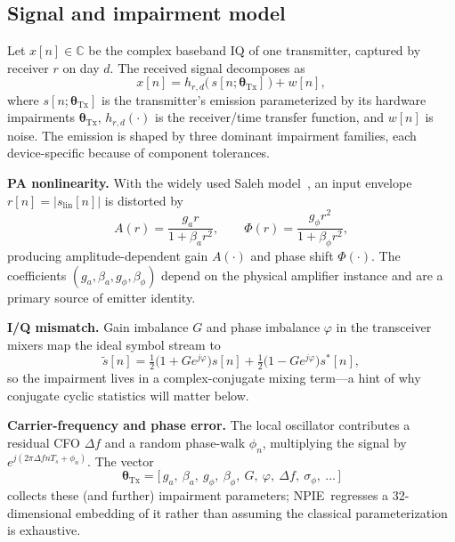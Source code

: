 \documentclass[journal]{IEEEtran}
\newcommand{\npie}{\textsc{NPIE}}
\newcommand{\tx}{\boldsymbol{\theta}_{\mathrm{Tx}}}
\begin{document}
\subsection{Signal and impairment model}
Let $x[n]\in\mathbb{C}$ be the complex baseband IQ of one transmitter, captured by receiver $r$ on day $d$. The received signal decomposes as
\begin{equation}
x[n] = h_{r,d}\big(\,s[n;\tx]\,\big) + w[n],
\label{eq:signal}
\end{equation}
where $s[n;\tx]$ is the transmitter's emission parameterized by its hardware impairments $\tx$, $h_{r,d}(\cdot)$ is the receiver/time transfer function, and $w[n]$ is noise. The emission is shaped by three dominant impairment families, each device-specific because of component tolerances.

\textbf{PA nonlinearity.} With the widely used Saleh model~\cite{saleh1981}, an input envelope $r[n]=|s_{\mathrm{lin}}[n]|$ is distorted by
\begin{equation}
A(r) = \frac{g_a r}{1+\beta_a r^2}, \qquad
\Phi(r) = \frac{g_\phi r^2}{1+\beta_\phi r^2},
\label{eq:saleh}
\end{equation}
producing amplitude-dependent gain $A(\cdot)$ and phase shift $\Phi(\cdot)$. The coefficients $(g_a,\beta_a,g_\phi,\beta_\phi)$ depend on the physical amplifier instance and are a primary source of emitter identity.

\textbf{I/Q mismatch.} Gain imbalance $G$ and phase imbalance $\varphi$ in the transceiver mixers map the ideal symbol stream to
\begin{equation}
\tilde{s}[n] = \tfrac{1}{2}\big(1+G e^{j\varphi}\big) s[n] + \tfrac{1}{2}\big(1-G e^{j\varphi}\big) s^{*}[n],
\label{eq:iq}
\end{equation}
so the impairment lives in a complex-conjugate mixing term---a hint of why conjugate cyclic statistics will matter below.

\textbf{Carrier-frequency and phase error.} The local oscillator contributes a residual CFO $\Delta f$ and a random phase-walk $\phi_n$, multiplying the signal by $e^{j(2\pi \Delta f n T_s + \phi_n)}$. The vector
\begin{equation}
\tx = \big[\,g_a,\ \beta_a,\ g_\phi,\ \beta_\phi,\ G,\ \varphi,\ \Delta f,\ \sigma_\phi,\ \dots\,\big]
\label{eq:theta}
\end{equation}
collects these (and further) impairment parameters; \npie\ regresses a 32-dimensional embedding of it rather than assuming the classical parameterization is exhaustive.
\end{document}
